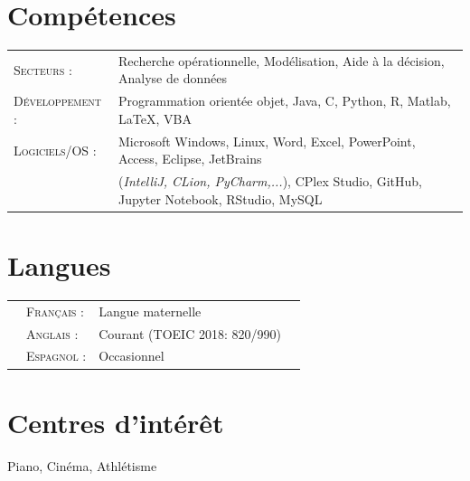 \documentclass[a4paper,10pt]{article}
\begin{document}
\section{Compétences}
\begin{tabular}{ll}	
\textsc{Secteurs :} & Recherche opérationnelle, Modélisation, Aide à la décision, Analyse de données\\
\textsc{Développement :} & Programmation orientée objet, Java, C, Python, R, Matlab, \LaTeX, VBA\\
\textsc{Logiciels/OS :} & Microsoft Windows, Linux, Word, Excel, PowerPoint, Access, Eclipse, JetBrains \\&(\emph{IntelliJ, CLion, PyCharm,...}), CPlex Studio, GitHub, Jupyter Notebook, RStudio, MySQL
\end{tabular}

\section{Langues}
\begin{flushleft}
\begin{tabular}{p{0.4cm}lll}
&\textsc{Français :}&Langue maternelle\\
&\textsc{Anglais :}&Courant (TOEIC 2018: 820/990)\\
&\textsc{Espagnol :}&Occasionnel
\end{tabular}
\end{flushleft}

\section{Centres d'intérêt}
\begin{flushleft}
Piano, Cinéma, Athlétisme
\end{flushleft}
\end{document}
